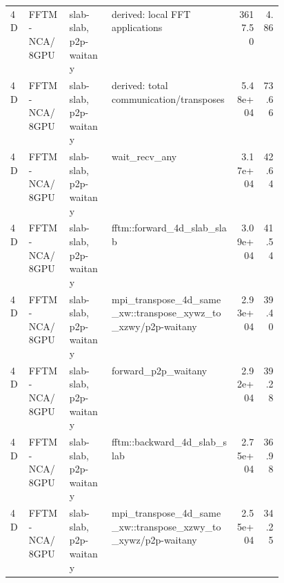 \documentclass{article}
\begin{document}
\begin{center}
{\begin{tabular}{lll p{0.46\linewidth} rr}
4D & FFTM-NCA/8GPU & slab-slab, p2p-waitany & derived: local FFT applications & 3617.50 & 4.86 \\
4D & FFTM-NCA/8GPU & slab-slab, p2p-waitany & derived: total communication/transposes & 5.48e+04 & 73.66 \\
4D & FFTM-NCA/8GPU & slab-slab, p2p-waitany & wait\_recv\_any & 3.17e+04 & 42.64 \\
4D & FFTM-NCA/8GPU & slab-slab, p2p-waitany & fftm::forward\_4d\_slab\_slab & 3.09e+04 & 41.54 \\
4D & FFTM-NCA/8GPU & slab-slab, p2p-waitany & mpi\_transpose\_4d\_same\_xw::transpose\_xywz\_to\_xzwy/p2p-waitany & 2.93e+04 & 39.40 \\
4D & FFTM-NCA/8GPU & slab-slab, p2p-waitany & forward\_p2p\_waitany & 2.92e+04 & 39.28 \\
4D & FFTM-NCA/8GPU & slab-slab, p2p-waitany & fftm::backward\_4d\_slab\_slab & 2.75e+04 & 36.98 \\
4D & FFTM-NCA/8GPU & slab-slab, p2p-waitany & mpi\_transpose\_4d\_same\_xw::transpose\_xzwy\_to\_xywz/p2p-waitany & 2.55e+04 & 34.25 \\
\hline
\end{tabular}
}
\end{center}
\end{document}
